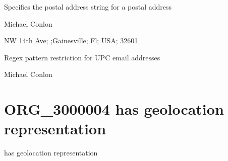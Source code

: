 \documentclass[letterpaper,10pt,english]{sphinxmanual}
\begin{document}
\begin{sphinxShadowBox}

\sphinxAtStartPar
Specifies the postal address string for a postal address
\end{sphinxShadowBox}

\begin{sphinxShadowBox}

\sphinxAtStartPar
Michael Conlon 
\end{sphinxShadowBox}

\begin{sphinxShadowBox}

 NW 14th Ave; ;Gainesville; Fl; USA; 32601
\end{sphinxShadowBox}

\begin{sphinxShadowBox}

\sphinxAtStartPar
Regex pattern restriction for UPC email addresses
\end{sphinxShadowBox}

\begin{sphinxShadowBox}

\sphinxAtStartPar
Michael Conlon 
\end{sphinxShadowBox}
\begin{quote}
\label{\detokenize{doc-ORG_3000004:org-3000004}}\label{\detokenize{doc-ORG_3000004:has-geolocation-representation}}\label{\detokenize{doc-ORG_3000004:org-3000004}}
\ignorespaces \end{quote}


\section{ORG\_3000004 \sphinxhyphen{} has geolocation representation}
\label{\detokenize{doc-ORG_3000004:org-3000004-has-geolocation-representation}}\label{\detokenize{doc-ORG_3000004:index-0}}\label{\detokenize{doc-ORG_3000004::doc}}
\begin{sphinxShadowBox}

\sphinxAtStartPar
has geolocation representation
\end{sphinxShadowBox}
\end{document}
